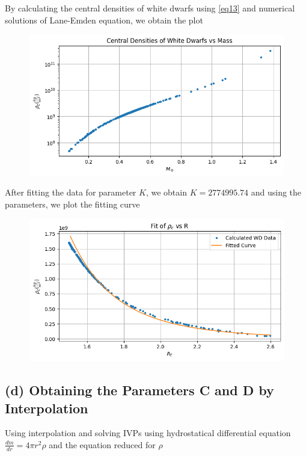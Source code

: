 \documentclass[aps,twocolumn,showpacs,preprintnumbers,nofootinbib,prl,superscriptaddress,groupedaddress]{revtex4-2}
\begin{document}
By calculating the central densities of white dwarfs using \ref{eq13} and numerical solutions of Lane-Emden equation, we obtain the plot

\begin{figure}[!htb]
	\centering
	\includegraphics[width=1\linewidth]{Plots/newton-part-c3}
	\label{fig:newton-part-c3}
\end{figure}
\FloatBarrier

After fitting the data for parameter $K$, we obtain $K = 2774995.74$ and using the parameters, we plot the fitting curve

\begin{figure}[!htb]
	\centering
	\includegraphics[width=1\linewidth]{Plots/newton-part-c4}
	\label{fig:newton-part-c4}
\end{figure}
\FloatBarrier

\subsection{(d) Obtaining the Parameters C and D by Interpolation}

Using interpolation and solving IVPs using hydrostatical differential equation $\frac{dm}{dr} = 4\pi r^2 \rho$ and the equation reduced for $\rho$
\end{document}
